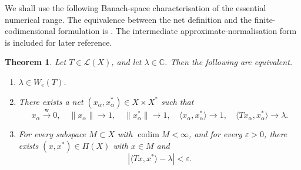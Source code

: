\documentclass[11pt]{amsart}
\numberwithin{equation}{section}
\newtheorem{theorem}{Theorem}[section]
\theoremstyle{definition}
\theoremstyle{remark}
\DeclareMathOperator{\codim}{codim}
\newcommand{\C}{\mathbb{C}}
\newcommand{\ip}[2]{\langle #1,#2\rangle}
\newcommand{\e}{\varepsilon}
\newcommand{\We}{W_e}
\newcommand{\wto}{\xrightarrow{\mathrm w}}
\begin{document}
We shall use the following Banach-space characterisation of the essential numerical range.  The equivalence between the net definition and the finite-codimensional formulation is \cite[Proposition~6]{BM}. The intermediate approximate-normalisation form is included for later reference.

\begin{theorem}\label{thm:characterization-We}
 Let $T\in \mathcal L(X)$, and let $\lambda\in\C$. Then the following are equivalent.
\begin{enumerate}[label=\textup{(\roman*)}]
\item $\lambda\in\We(T)$.
\item There exists a net $(x_\alpha,x^*_\alpha)\in X\times X^*$ such that
\[
x_\alpha\wto 0,
\quad
\|x_\alpha\|\to 1,
\quad
\|x_\alpha^*\|\to 1,
\quad
\ip{x_\alpha}{x_\alpha^*}\to 1,
\quad
\ip{Tx_\alpha}{x_\alpha^*}\to \lambda.
\]
\item For every subspace $M\subset X$ with $\codim M<\infty$, and for every $\e>0$, there exists $(x,x^*)\in\Pi(X)$ with $x\in M$ and
\[
|\ip{Tx}{x^*}-\lambda|<\e.
\]
\end{enumerate}
\end{theorem}
\end{document}
